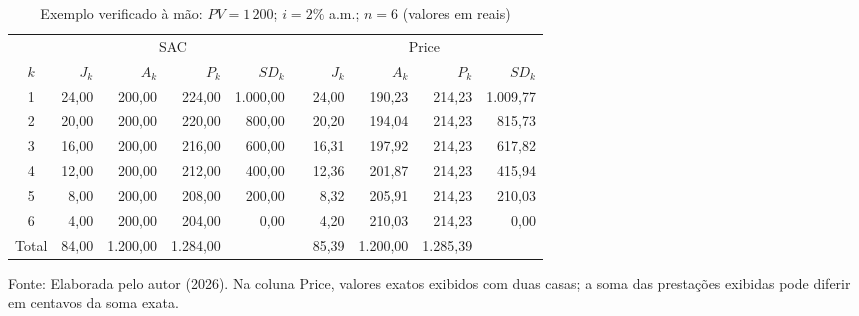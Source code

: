 \begin{table}[htb]
\centering
\small
\caption{Exemplo verificado à mão: $PV=1\,200$; $i=2\%$ a.m.; $n=6$ (valores em reais)}
\label{tab:exemplo-c2}
\begin{tabular}{c rrrr c rrrr}
\hline
 & \multicolumn{4}{c}{SAC} & & \multicolumn{4}{c}{Price} \\
\cline{2-5}\cline{7-10}
$k$ & $J_k$ & $A_k$ & $P_k$ & $SD_k$ & & $J_k$ & $A_k$ & $P_k$ & $SD_k$ \\
\hline
1 & 24{,}00 & 200{,}00 & 224{,}00 & 1.000{,}00 & & 24{,}00 & 190{,}23 & 214{,}23 & 1.009{,}77 \\
2 & 20{,}00 & 200{,}00 & 220{,}00 & 800{,}00 & & 20{,}20 & 194{,}04 & 214{,}23 & 815{,}73 \\
3 & 16{,}00 & 200{,}00 & 216{,}00 & 600{,}00 & & 16{,}31 & 197{,}92 & 214{,}23 & 617{,}82 \\
4 & 12{,}00 & 200{,}00 & 212{,}00 & 400{,}00 & & 12{,}36 & 201{,}87 & 214{,}23 & 415{,}94 \\
5 & 8{,}00 & 200{,}00 & 208{,}00 & 200{,}00 & & 8{,}32 & 205{,}91 & 214{,}23 & 210{,}03 \\
6 & 4{,}00 & 200{,}00 & 204{,}00 & 0{,}00 & & 4{,}20 & 210{,}03 & 214{,}23 & 0{,}00 \\
\hline
Total & 84{,}00 & 1.200{,}00 & 1.284{,}00 & & & 85{,}39 & 1.200{,}00 & 1.285{,}39 & \\
\hline
\end{tabular}
\par\vspace{0.1cm}
{\small Fonte: Elaborada pelo autor (2026). Na coluna Price, valores exatos exibidos com duas casas; a soma das prestações exibidas pode diferir em centavos da soma exata.}
\end{table}
